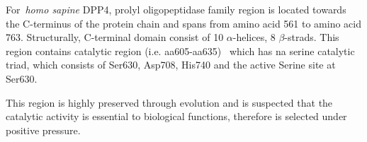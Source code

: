 For~\textit{homo sapine} DPP4, prolyl oligopeptidase family region is located towards the C-terminus of the protein chain and spans from amino acid 561 to amino acid 763. Structurally, C-terminal domain consist of 10 $\alpha$-helices, 8 $\beta$-strads. This region contains catalytic region (i.e. aa605-aa635)~\cite{Rawlings1991,Barrett1992,Polgár1992,Rawlings1994} which has na serine catalytic triad, which consists of Ser630, Asp708, His740 and the active Serine site at Ser630. \par
This region is highly preserved through evolution and is suspected that the catalytic activity is essential to biological functions, therefore is selected under positive pressure. 